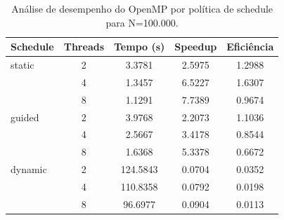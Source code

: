 \documentclass[12pt, a4paper]{article}
\begin{document}
\begin{table}[H]
\centering
\caption{Análise de desempenho do OpenMP por política de schedule para N=100.000.}
\label{tab:openmp-schedule}
\begin{tabular}{lcccc}
\toprule
\textbf{Schedule} & \textbf{Threads} & \textbf{Tempo (s)} & \textbf{Speedup} & \textbf{Eficiência} \\
\midrule
static            & 2                & 3.3781             & 2.5975           & 1.2988              \\
                  & 4                & 1.3457             & 6.5227           & 1.6307              \\
                  & 8                & 1.1291             & 7.7389           & 0.9674              \\
\midrule
guided            & 2                & 3.9768             & 2.2073           & 1.1036              \\
                  & 4                & 2.5667             & 3.4178           & 0.8544              \\
                  & 8                & 1.6368             & 5.3378           & 0.6672              \\
\midrule
dynamic           & 2                & 124.5843           & 0.0704           & 0.0352              \\
                  & 4                & 110.8358           & 0.0792           & 0.0198              \\
                  & 8                & 96.6977            & 0.0904           & 0.0113              \\
\bottomrule
\end{tabular}
\end{table}
\end{document}

